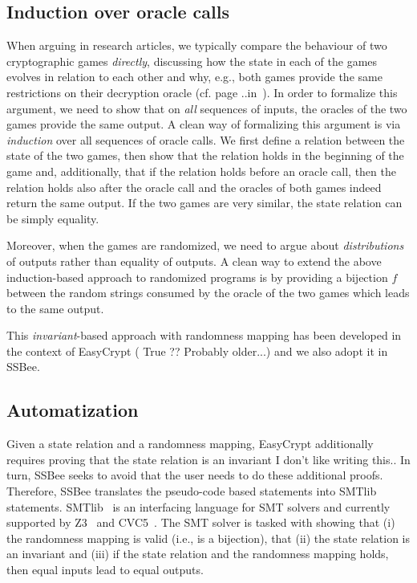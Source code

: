 \subsection{Induction over oracle calls}
When arguing in research articles, we typically compare the behaviour of
two cryptographic games \emph{directly}, discussing how the state in each
of the games evolves in relation to each other and why, e.g., both games
provide the same restrictions on their decryption oracle (cf. page ..in~\cite{X}).
In order to formalize this argument, we need to show that on \emph{all} sequences of inputs, the oracles of the two games provide the same output. A clean way of formalizing this argument is via \emph{induction} over all sequences of oracle calls. We first define a relation between the state of the two games, then show that the relation holds in the beginning of the game and, additionally, that if the relation holds before an oracle call, then the relation holds also after the oracle call and the oracles of both games indeed return the same output. If the two games are very similar, the state relation can be simply equality.

Moreover, when the games are randomized, we need to argue about \emph{distributions}
of outputs rather than equality of outputs. A clean way to extend the above induction-based approach to randomized programs is by providing a bijection $f$ between
the random strings consumed by the oracle of the two games which leads to the
same output.

This \emph{invariant}-based approach with randomness mapping has been developed in the context of EasyCrypt {(\color{blue} True ?? Probably older...)} and we also adopt it in SSBee.

\subsection{Automatization}
Given a state relation and a randomness mapping, EasyCrypt additionally requires
proving that the state relation is an invariant {\color{blue} I don't like writing this.}. In turn, SSBee seeks to avoid that the user needs to do these additional proofs. Therefore, SSBee translates the pseudo-code based statements into SMTlib statements. SMTlib~\cite{X} is an interfacing language for SMT solvers and currently supported by Z3~\cite{X} and CVC5~\cite{X}. The SMT solver is tasked with showing that (i) the randomness mapping is valid (i.e., is a bijection), that (ii) the state relation is an invariant and (iii) if the state relation and the randomness mapping holds, then equal inputs lead to equal outputs.

